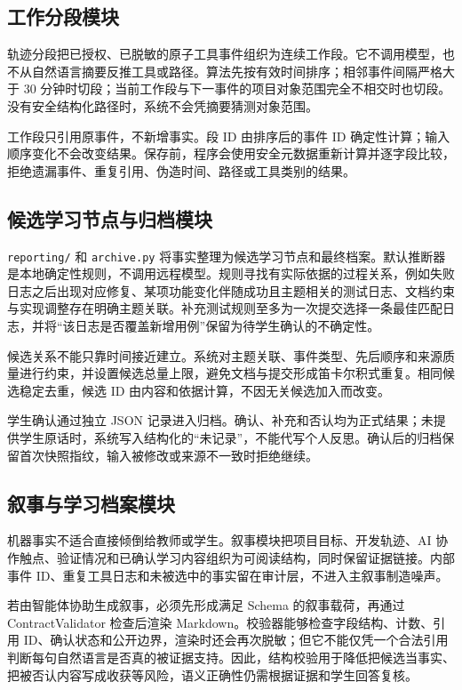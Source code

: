 \documentclass[UTF8,a4paper,12pt]{ctexart}
\begin{document}
\subsection{工作分段模块}

轨迹分段把已授权、已脱敏的原子工具事件组织为连续工作段。它不调用模型，也不从自然语言摘要反推工具或路径。算法先按有效时间排序；相邻事件间隔严格大于 30 分钟时切段；当前工作段与下一事件的项目对象范围完全不相交时也切段。没有安全结构化路径时，系统不会凭摘要猜测对象范围。

工作段只引用原事件，不新增事实。段 ID 由排序后的事件 ID 确定性计算；输入顺序变化不会改变结果。保存前，程序会使用安全元数据重新计算并逐字段比较，拒绝遗漏事件、重复引用、伪造时间、路径或工具类别的结果。

\subsection{候选学习节点与归档模块}

\texttt{reporting/} 和 \texttt{archive.py} 将事实整理为候选学习节点和最终档案。默认推断器是本地确定性规则，不调用远程模型。规则寻找有实际依据的过程关系，例如失败日志之后出现对应修复、某项功能变化伴随成功且主题相关的测试日志、文档约束与实现调整存在明确主题关联。补充测试规则至多为一次提交选择一条最佳匹配日志，并将“该日志是否覆盖新增用例”保留为待学生确认的不确定性。

候选关系不能只靠时间接近建立。系统对主题关联、事件类型、先后顺序和来源质量进行约束，并设置候选总量上限，避免文档与提交形成笛卡尔积式重复。相同候选稳定去重，候选 ID 由内容和依据计算，不因无关候选加入而改变。

学生确认通过独立 JSON 记录进入归档。确认、补充和否认均为正式结果；未提供学生原话时，系统写入结构化的“未记录”，不能代写个人反思。确认后的归档保留首次快照指纹，输入被修改或来源不一致时拒绝继续。

\subsection{叙事与学习档案模块}

机器事实不适合直接倾倒给教师或学生。叙事模块把项目目标、开发轨迹、AI 协作触点、验证情况和已确认学习内容组织为可阅读结构，同时保留证据链接。内部事件 ID、重复工具日志和未被选中的事实留在审计层，不进入主叙事制造噪声。

若由智能体协助生成叙事，必须先形成满足 Schema 的叙事载荷，再通过 ContractValidator 检查后渲染 Markdown。校验器能够检查字段结构、计数、引用 ID、确认状态和公开边界，渲染时还会再次脱敏；但它不能仅凭一个合法引用判断每句自然语言是否真的被证据支持。因此，结构校验用于降低把候选当事实、把被否认内容写成收获等风险，语义正确性仍需根据证据和学生回答复核。
\end{document}
